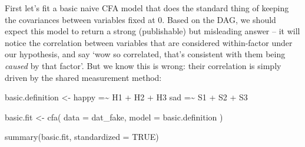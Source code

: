 \documentclass[
  letterpaper,
  DIV=11,
  numbers=noendperiod]{scrreprt}
\newenvironment{Shaded}{\begin{snugshade}}{\end{snugshade}}
\newcommand{\AttributeTok}[1]{\textcolor[rgb]{0.40,0.45,0.13}{#1}}
\newcommand{\ConstantTok}[1]{\textcolor[rgb]{0.56,0.35,0.01}{#1}}
\newcommand{\FunctionTok}[1]{\textcolor[rgb]{0.28,0.35,0.67}{#1}}
\newcommand{\NormalTok}[1]{\textcolor[rgb]{0.00,0.23,0.31}{#1}}
\newcommand{\OtherTok}[1]{\textcolor[rgb]{0.00,0.23,0.31}{#1}}
\newcommand{\StringTok}[1]{\textcolor[rgb]{0.13,0.47,0.30}{#1}}
\begin{document}
First let's fit a basic naive CFA model that does the standard thing of
keeping the covariances between variables fixed at 0. Based on the DAG,
we should expect this model to return a strong (publishable) but
misleading answer -- it will notice the correlation between variables
that are considered within-factor under our hypothesis, and say `wow so
correlated, that's consistent with them being \emph{caused} by that
factor'. But we know this is wrong: their correlation is simply driven
by the shared measurement method:

\begin{Shaded}
\begin{Highlighting}[]
\NormalTok{basic.definition }\OtherTok{\textless{}{-}} 
  \StringTok{\textquotesingle{}happy =\textasciitilde{} H1 + H2 + H3}
\StringTok{   sad =\textasciitilde{} S1 + S2 + S3}
\StringTok{   \textquotesingle{}}

\NormalTok{basic.fit }\OtherTok{\textless{}{-}} \FunctionTok{cfa}\NormalTok{(}
  \AttributeTok{data =}\NormalTok{ dat\_fake,}
  \AttributeTok{model =}\NormalTok{ basic.definition}
\NormalTok{)}

\FunctionTok{summary}\NormalTok{(basic.fit, }\AttributeTok{standardized =} \ConstantTok{TRUE}\NormalTok{)}
\end{Highlighting}
\end{Shaded}
\end{document}
